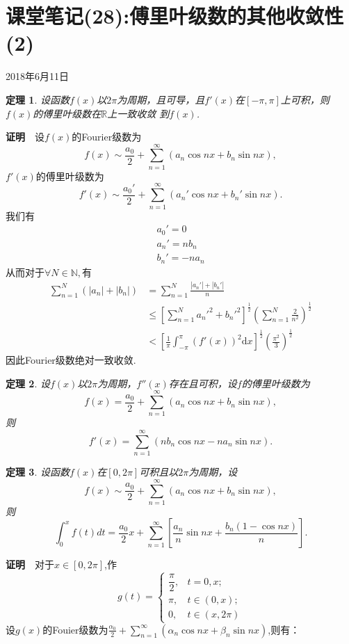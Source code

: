 \documentclass[UTF8]{article}
\newcommand{\R}{\mathbb{R}}
\newcommand{\dx}{\mathrm{d}x}
\newcommand{\zm}{\textbf{证明}$\quad$}
\newtheorem{thm}{\hspace{2em}定理}[section]
\begin{document}
  \section{课堂笔记(28):傅里叶级数的其他收敛性(2)}
  \begin{center}
    2018年6月11日
  \end{center}
  \begin{thm}
    设函数$f(x)$以$2\pi$为周期，且可导，且$f'(x)$在$[-\pi,\pi]$上可积，则$f(x)$的傅里叶级数在$\R$上一致收敛
    到$f(x)$.
  \end{thm}
  \zm 设$f(x)$的Fourier级数为
  $$f(x)\sim \frac{a_0}{2}+\sum_{n=1}^\infty(a_n\cos nx+b_n\sin nx),$$
  $f'(x)$的傅里叶级数为
  $$f'(x)\sim \frac{a_0'}{2}+\sum_{n=1}^\infty(a_n'\cos nx+b_n'\sin nx).$$
  我们有
  \begin{gather*}
    a_0'=0\\
    a_n'=nb_n\\
    b_n'=-na_n
  \end{gather*}
  从而对于$\forall N\in \mathbb{N},$有
  \begin{align*}
    \sum_{n=1}^N(|a_n|+|b_n|)&=\sum_{n=1}^N\frac{|a_n'|+|b_n'|}{n}\\
    &\le\left[\sum_{n=1}^Na_n'^2+b_n'^2\right]^\frac{1}{2}\left(\sum_{n=1}^N\frac{2}{n^2}\right)^\frac{1}{2}\\
    &<\left[\frac{1}{\pi}\int_{-\pi}^\pi(f'(x))^2\dx\right]^\frac{1}{2}\left(\frac{\pi^2}{3}\right)^\frac{1}{2}
  \end{align*}
  因此Fourier级数绝对一致收敛.
  \begin{thm}
    设$f(x)$以$2\pi$为周期，$f''(x)$存在且可积，设$f$的傅里叶级数为
    $$f(x)=\frac{a_0}{2}+\sum_{n=1}^\infty(a_n\cos nx+b_n\sin nx),$$
    则$$f'(x)=\sum_{n=1}^\infty(nb_n\cos nx-na_n\sin nx).$$
  \end{thm}
  \begin{thm}
    设函数$f(x)$在$[0,2\pi]$可积且以$2\pi$为周期，设
    $$f(x)\sim\frac{a_0}{2}+\sum_{n=1}^\infty(a_n\cos nx+b_n\sin nx),$$
    则$$\int_0^xf(t)dt=\frac{a_0}{2}x+\sum_{n=1}^\infty\left[\frac{a_n}{n}\sin nx+\frac{b_n(1-\cos nx)}{n}\right].$$
  \end{thm}
  \zm 对于$x\in[0,2\pi]$,作
  \[ g(t)=
  \begin{cases}
    \dfrac{\pi}{2},&t=0,x;\\
    \pi,&t\in(0,x);\\
    0,&t\in(x,2\pi)
  \end{cases}
  \]
  设$g(x)$的Fouier级数为$\frac{\alpha_0}{2}+\sum_{n=1}^\infty(\alpha_n\cos nx+\beta_n\sin nx)$,则有：
\end{document}

